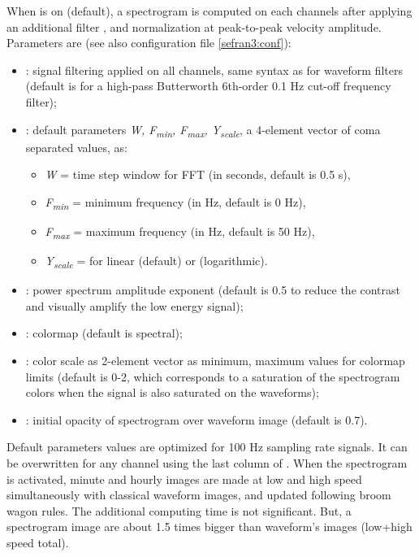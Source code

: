 When  is on (default), a spectrogram is computed on each channels after applying an additional filter , and normalization at peak-to-peak velocity amplitude. Parameters are (see also configuration file \ref{sefran3:conf}):
\begin{itemize}
\item {}: signal filtering applied on all channels, same syntax as for waveform filters (default is  for a high-pass Butterworth 6th-order 0.1 Hz cut-off frequency filter);
\item {}: default parameters \textit{W, F\textsubscript{min}, F\textsubscript{max}, Y\textsubscript{scale}}, a 4-element vector of coma separated values, as:
	\begin{itemize}
		\item \textit{W} = time step window for FFT (in seconds, default is 0.5 s),
		\item \textit{F\textsubscript{min}} = minimum frequency (in Hz, default is 0 Hz),
		\item \textit{F\textsubscript{max}} = maximum frequency (in Hz, default is 50 Hz),
		\item \textit{Y\textsubscript{scale}} =  for linear (default) or  (logarithmic).
	\end{itemize}
\item {}: power spectrum amplitude exponent (default is 0.5 to reduce the contrast and visually amplify the low energy signal);
\item {}: colormap (default is spectral);
\item {}: color scale as 2-element vector as minimum, maximum values for colormap limits (default is 0-2, which corresponds to a saturation of the spectrogram colors when the signal is also saturated on the waveforms);
\item {}: initial opacity of spectrogram over waveform image (default is 0.7).
\end{itemize}

Default parameters  values are optimized for 100 Hz sampling rate signals. It can be overwritten for any channel using the last column of .  When the spectrogram is activated, minute and hourly images are made at low and high speed simultaneously with classical waveform images, and updated following broom wagon rules. The additional computing time is not significant. But, a spectrogram image are about 1.5 times bigger than waveform's images (low+high speed total).

